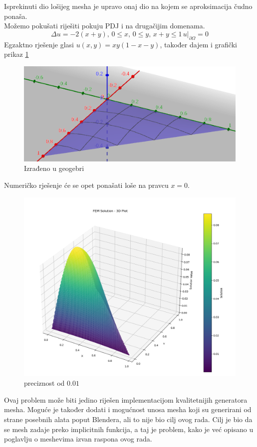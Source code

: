 \documentclass[zavrsnirad]{../fer}
\begin{document}
Isprekinuti dio lošijeg mesha je upravo onaj dio na 
kojem se aproksimacija čudno ponaša. 
\\
Možemo pokušati riješiti pokuju PDJ i na drugačijim domenama.
\begin{equation}
  \Delta u =- 2(x +y),\, 0 \leq x, \, 0 \leq y, \, x + y \leq 1 
  \, u |_{ \partial \Omega} = 0
\end{equation}
Egzaktno rješenje glasi $u(x,y) = xy(1- x - y)$, također 
dajem i grafički prikaz \ref{xy1xy}
\begin{figure}[H]
	\centering
	\includegraphics[width=0.8\linewidth]{Figures/xy1xy.png}
	\caption{Izrađeno u geogebri}
  \label{xy1xy}
\end{figure}
\newpage
Numeričko rješenje će se opet ponašati loše na pravcu $x=0$.

\begin{figure}[H]
	\centering
	\includegraphics[width=1.2\linewidth]{Figures/numerxy1xy.png}
	\caption{preciznost od $0.01$}
  \label{}
\end{figure}
Ovaj problem može biti jedino riješen implementacijom 
kvalitetnijih generatora mesha. Moguće je također dodati i 
mogućnost unosa mesha koji su generirani od strane posebnih
alata poput Blendera, ali to nije bio cilj ovog rada. 
Cilj je bio da se mesh zadaje preko implicitnih funkcija,
a taj je problem, kako je već opisano u poglavlju o
meshevima izvan raspona ovog rada.
\newpage
\end{document}
